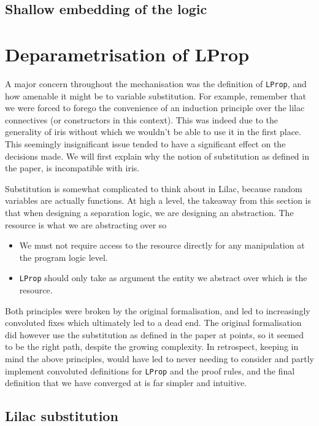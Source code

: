\subsection{Shallow embedding of the logic}


\section{Deparametrisation of LProp}

A major concern throughout the mechanisation was the definition of \texttt{LProp}, and how amenable it might be to variable substitution. For example, remember that we were forced to forego
the convenience of an induction principle over the lilac connectives (or constructors in this context). This was indeed due to the generality of iris without which we wouldn't
be able to use it in the first place.
This seemingly insignificant issue tended to
have a significant effect on the decisions made. We will first explain
why the notion of substitution as defined in the paper, is incompatible with iris. %

Substitution is somewhat complicated to think about in Lilac, because random variables are actually functions. At high a level, the takeaway from this section is that when designing a separation
logic, we are designing an abstraction. The resource is what we are abstracting over so
\begin{itemize}
\item We must not require access to the resource directly for any manipulation at the program logic level.
\item \texttt{LProp} should only take as argument the entity we abstract over which is the resource.
\end{itemize}

Both principles were broken by the original formalisation, and led to increasingly convoluted fixes which ultimately led to a dead end.
The original formalisation did however use the substitution as defined in the paper at points, so it seemed to be the right path, despite the growing complexity. In retrospect, keeping
in mind the above principles, would have led to never needing to consider and partly implement convoluted definitions for \texttt{LProp} and the proof rules, and the final definition that we have
converged at is far simpler and intuitive.

\subsection{Lilac substitution}

